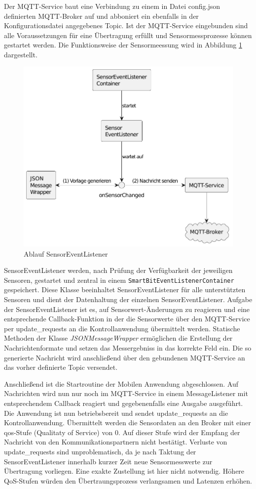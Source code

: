 \documentclass[11pt,a4paper]{report}
\begin{document}
Der MQTT-Service baut eine Verbindung zu einem in Datei config.json definierten MQTT-Broker auf und abboniert ein ebenfalls in der Konfigurationsdatei angegebenes Topic.
Ist der MQTT-Service eingebunden sind alle Voraussetzungen für eine Übertragung erfüllt und  Sensormessprozesse können gestartet werden.
Die Funktionsweise der Sensormeessung wird in Abbildung \ref{fig:sensor_event_listener} dargestellt.
\begin{figure}[htbp]
  \centering
  \includegraphics[width=.8\textwidth]{images/sensor_event_listener}
  \caption{Ablauf SensorEventListener}
  \label{fig:sensor_event_listener}
\end{figure}
SensorEventListener werden, nach Prüfung der Verfügbarkeit der jeweiligen Sensoren, gestartet und zentral in einem \texttt{SmartBitEventListenerContainer} gespeichert.
Diese Klasse beeinhaltet SensorEventListener für alle unterstützten Sensoren und dient der Datenhaltung der einzelnen SensorEventListener.
Aufgabe der SensorEventListener ist es, auf Sensorwert-Änderungen zu reagieren und eine entsprechende Callback-Funktion in der die Sensorwerte über den MQTT-Service per update\_requests an die Kontrollanwendung übermittelt werden.
Statische Methoden der Klasse \textit{JSONMessageWrapper} ermöglichen die Erstellung der Nachrichtenformate und setzen das Messergebniss in das korrekte Feld ein.
Die so generierte Nachricht wird anschließend über den gebundenen MQTT-Service an das vorher definierte Topic versendet.

Anschließend ist die Startroutine der Mobilen Anwendung abgeschlossen.
Auf Nachrichten wird nun nur noch im MQTT-Service in einem MessageListener mit entsprechendem Callback reagiert und gegebenenfalls eine Ausgabe ausgeführt.
Die Anwendung ist nun betriebsbereit und sendet update\_requests an die Kontrollanwendung.
Übermittelt werden die Sensordaten an den Broker mit einer \acrshort{qos}-Stufe (Qualitaty of Service) von 0.
Auf dieser Stufe wird der Empfang der Nachricht von den Kommunikationspartnern nicht bestätigt.
Verluste von update\_requests sind unproblematisch, da je nach Taktung der SensorEventListener innerhalb kurzer Zeit neue Sensormesswerte zur Übertragung vorliegen.
Eine exakte Zustellung ist hier nicht notwendig.
Höhere QoS-Stufen würden den Übertraungsprozess verlangsamen und Latenzen erhöhen.
\end{document}
